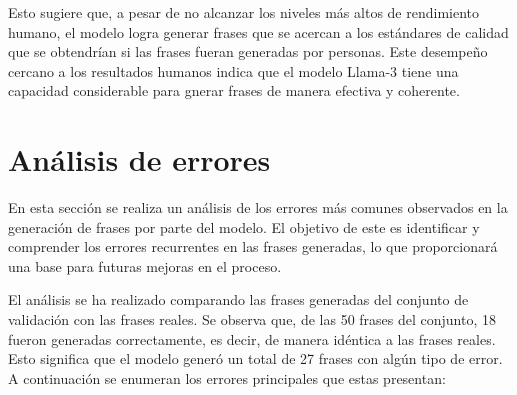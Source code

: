 \documentclass[11pt,spanish,listoffigures,listoftables]{tfgetsinf}
\begin{document}
Esto sugiere que, a pesar de no alcanzar los niveles más altos de rendimiento humano, el modelo logra generar frases que se acercan a los estándares de calidad que se obtendrían si las frases fueran generadas por personas. Este desempeño cercano a los resultados humanos indica que el modelo Llama-3 tiene una capacidad considerable para gnerar frases de manera efectiva y coherente.

\section{Análisis de errores}

En esta sección se realiza un análisis de los errores más comunes observados en la generación de frases por parte del modelo. El objetivo de este es identificar y comprender los errores recurrentes en las frases generadas, lo que proporcionará una base para futuras mejoras en el proceso.

El análisis se ha realizado comparando las frases generadas del conjunto de validación con las frases reales. Se observa que, de las 50 frases del conjunto, 18 fueron generadas correctamente, es decir, de manera idéntica a las frases reales. Esto significa que el modelo generó un total de 27 frases con algún tipo de error. A continuación se enumeran los errores principales que estas presentan:
\end{document}
